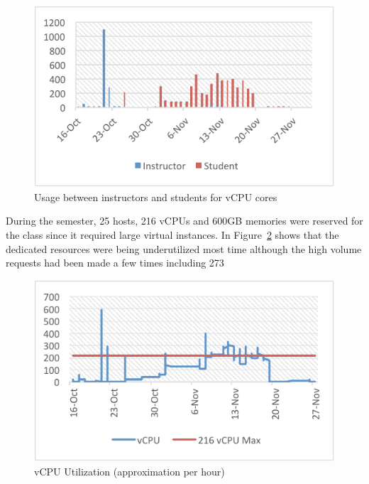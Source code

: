 \documentclass{sig-alternate}
\begin{document}
 
\begin{figure}[h!] 
  \centering 
    \includegraphics[width=1.0\columnwidth]{images/fig4.pdf} 
  \caption{Usage between instructors and students for vCPU cores}\label{F:fig5} 
\end{figure} 

During the semester, 25 hosts, 216 vCPUs and 600GB memories were reserved for the class since it required large virtual instances. In Figure~\ref{F:fig6} shows that the dedicated resources were being underutilized most time although the high volume requests had been made a few times including 273%
  
\begin{figure}[h!] 
  \centering 
    \includegraphics[width=1.0\columnwidth]{images/fig5.pdf} 
  \caption{vCPU Utilization (approximation per hour)}\label{F:fig6} 
\end{figure} 
\end{document}
